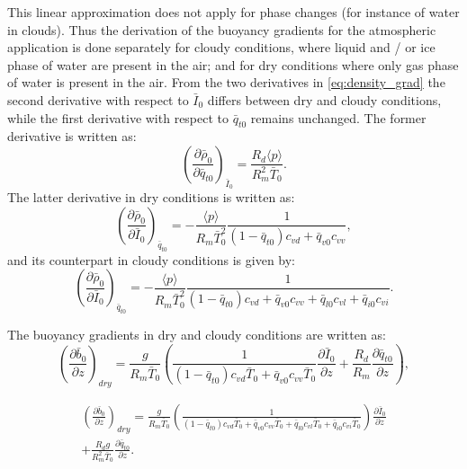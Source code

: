 \documentclass{report}
\begin{document}
This linear approximation does not apply for phase changes (for instance of water in clouds). Thus the derivation of the buoyancy gradients for the atmospheric application is done separately for cloudy conditions, where liquid and / or ice phase of water are present in the air; and for dry conditions where only gas phase of water is present in the air. From the two derivatives in \eqref{eq:density_grad} the second derivative with respect to $\bar{I}_0$ differs between dry and cloudy conditions, while the first derivative with respect to $\bar{q}_{t0}$ remains unchanged. The former derivative is written as:
\begin{equation}
\label{eq:density_grad_qt} 
\left( \frac{\partial \bar{\rho}_0}{\partial \bar{q}_{t0}} \right)_{\bar{I}_0} = \frac{R_d \langle p \rangle}{R_m^2 \bar{T}_0}.
\end{equation}
The latter derivative in dry conditions is written as:
\begin{equation}
\label{eq:density_grad_I_dry} 
\left( \frac{\partial \bar{\rho}_0}{\partial \bar{I}_0}\right)_{\bar{q}_{t0}} = - \frac{\langle p \rangle}{R_m \bar{T}^2_0} \frac{1}{(1-\bar{q}_{t0})c_{vd} + \bar{q}_{v0}c_{vv}},
\end{equation}
and its counterpart in cloudy conditions is given by:
\begin{equation}
\label{eq:density_grad_I_cloudy} 
\left( \frac{\partial \bar{\rho}_0}{\partial \bar{I}_0}\right)_{\bar{q}_{t0}} = - \frac{\langle p \rangle}{R_m \bar{T}^2_0} \frac{1}{(1-\bar{q}_{t0})c_{vd} + \bar{q}_{v0}c_{vv} + \bar{q}_{l0}c_{vl} + \bar{q}_{i0}c_{vi}}.
\end{equation}

The buoyancy gradients in dry and cloudy conditions are written as:
\begin{equation}
\label{eq:buoyancy_gradient_dry} 
\left( \frac{\partial \bar{b}_0}{\partial z}\right)_{dry} = \frac{g}{R_m \bar{T}_0} \left(\frac{1}{(1-\bar{q}_{t0})c_{vd}\bar{T}_0 + \bar{q}_{v0}c_{vv}\bar{T}_0}\frac{\partial \bar{I}_0}{\partial z} +  \frac{R_d}{R_m} \frac{\partial \bar{q}_{t0}}{\partial z} \right),
\end{equation}

\begin{multline}
\label{eq:buoyancy_gradient_cloudy} 
\left( \frac{\partial \bar{b}_0}{\partial z}\right)_{dry} = \frac{g}{R_m \bar{T}_0} \left(\frac{1}{(1-\bar{q}_{t0})c_{vd}\bar{T}_0 + \bar{q}_{v0}c_{vv}\bar{T}_0 + \bar{q}_{l0}c_{vl}\bar{T}_0 + \bar{q}_{i0}c_{vi}\bar{T}_0}\right)\frac{\partial \bar{I}_0}{\partial z} \\ 
+ \frac{R_d g}{R_m^2 \bar{T}_0} \frac{\partial \bar{q}_{t0}}{\partial z}.
\end{multline}
\end{document}

